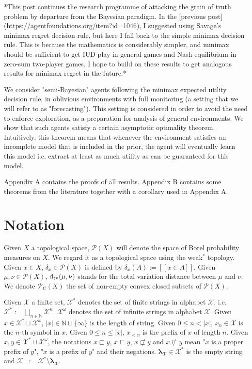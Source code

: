 \documentclass[a4paper]{article}
\newcommand{\Dtv}{\operatorname{d}_{\textnormal{tv}}}
\newcommand{\Nats}{\mathbb{N}}
\newcommand{\Estr}{\bm{\lambda}}
\newcommand{\Abs}[1]{\lvert #1 \rvert}
\newcommand{\Prob}{\mathcal{P}}
\newcommand{\CC}{\mathcal{P}_{\operatorname{C}}}
\begin{document}
*This post continues the research programme of attacking the grain of truth problem by departure from the Bayesian paradigm. In the [previous post](https://agentfoundations.org/item?id=1046), I suggested using Savage's minimax regret decision rule, but here I fall back to the simple minimax decision rule. This is because the mathematics is considerably simpler, and minimax should be sufficient to get IUD play in general games and Nash equilibrium in zero-sum two-player games. I hope to build on these results to get analogous results for minimax regret in the future.*

We consider "semi-Bayesian" agents following the minimax expected utility decision rule, in oblivious environments with full monitoring (a setting that we will refer to as "forecasting"). This setting is considered in order to avoid the need to enforce exploration, as a preparation for analysis of general environments. We show that such agents satisfy a certain asymptotic optimality theorem. Intuitively, this theorem means that whenever the environment satisfies an incomplete model that is included in the prior, the agent will eventually learn this model i.e. extract at least as much utility as can be guaranteed for this model.

Appendix A contains the proofs of all results. Appendix B contains some theorems from the literature together with a corollary used in Appendix A.

\section{Notation}

Given ${X}$ a topological space, ${\Prob(X)}$ will denote the space of Borel probability measures on ${X}$. We regard it as a topological space using the weak${^*}$ topology. Given ${x \in X}$, ${\delta_x \in \Prob(X)}$ is defined by ${\delta_x(A):=[[x \in A]]}$. Given ${\mu, \nu \in \Prob(X)}$, ${\Dtv(\mu, \nu)}$ stands for the total variation distance between ${\mu}$ and ${\nu}$. We denote ${\CC(X)}$ the set of non-empty convex closed subsets of ${\Prob(X)}$.

Given ${\mathcal{X}}$ a finite set, ${\mathcal{X}^*}$ denotes the set of finite strings in alphabet ${\mathcal{X}}$, i.e. ${\mathcal{X}^*:=\bigsqcup_{n \in \Nats} \mathcal{X}^n}$. ${\mathcal{X}^\omega}$ denotes the set of infinite strings in alphabet ${\mathcal{X}}$. Given ${x \in \mathcal{X}^* \sqcup \mathcal{X}^\omega}$, ${\Abs{x} \in \Nats \sqcup \{\infty\}}$ is the length of string. Given ${0 \leq n < \Abs{x}}$, ${x_n \in \mathcal{X}}$ is the ${n}$-th symbol in ${x}$. Given ${0 \leq n \leq \Abs{x}}$, ${x_{<n}}$ is the prefix of ${x}$ of length ${n}$. Given ${x,y \in \mathcal{X}^* \sqcup \mathcal{X}^\omega}$, the notations ${x \sqsubset y}$, ${x \sqsubseteq y}$, ${x \not\sqsubset y}$ and ${x \not\sqsubseteq y}$ mean "${x}$ is a proper prefix of ${y}$", "${x}$ is a prefix of ${y}$" and their negations. ${\Estr_\mathcal{X} \in \mathcal{X}^*}$ is the empty string and ${\mathcal{X}^{+}:=\mathcal{X}^* \setminus \Estr_\mathcal{X}}$. 
\end{document}
